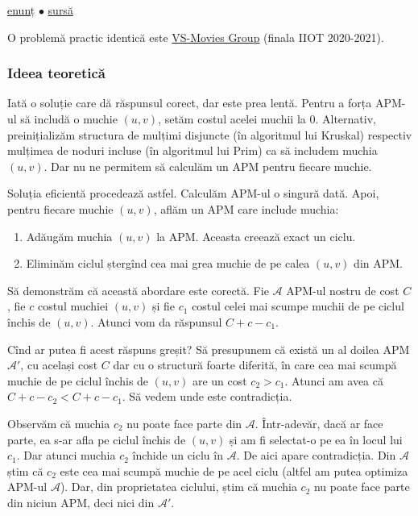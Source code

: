 \documentclass[../main.tex]{subfiles}
\begin{document}
\href{https://codeforces.com/contest/609/problem/E}{enunț}
$\bullet$
\hyperref[code:mst-for-each-edge]{sursă}

O problemă practic identică este \href{https://kilonova.ro/problems/1007}{VS-Movies Group} (finala IIOT 2020-2021).

\subsubsection*{Ideea teoretică}

Iată o soluție care dă răspunsul corect, dar este prea lentă. Pentru a forța APM-ul să includă o muchie $(u, v)$, setăm costul acelei muchii la 0. Alternativ, preinițializăm structura de mulțimi disjuncte (în algoritmul lui Kruskal) respectiv mulțimea de noduri incluse (în algoritmul lui Prim) ca să includem muchia $(u, v)$. Dar nu ne permitem să calculăm un APM pentru fiecare muchie.

Soluția eficientă procedează astfel. Calculăm APM-ul o singură dată. Apoi, pentru fiecare muchie $(u,v)$, aflăm un APM care include muchia:

\begin{enumerate}
  \item Adăugăm muchia $(u,v)$ la APM. Aceasta creează exact un ciclu.
  \item Eliminăm ciclul ștergînd cea mai grea muchie de pe calea $(u, v)$ din APM.
\end{enumerate}

Să demonstrăm că această abordare este corectă. Fie $\mathcal{A}$ APM-ul nostru de cost $C$, fie $c$ costul muchiei $(u,v)$ și fie $c_1$ costul celei mai scumpe muchii de pe ciclul închis de $(u,v)$. Atunci vom da răspunsul $C + c - c_1$.

Cînd ar putea fi acest răspuns greșit? Să presupunem că există un al doilea APM $\mathcal{A'}$, cu același cost $C$ dar cu o structură foarte diferită, în care cea mai scumpă muchie de pe ciclul închis de $(u,v)$ are un cost $c_2 > c_1$. Atunci am avea că $C + c - c_2 < C + c - c_1$. Să vedem unde este contradicția.

Observăm că muchia $c_2$ nu poate face parte din $\mathcal{A}$. Într-adevăr, dacă ar face parte, ea s-ar afla pe ciclul închis de $(u,v)$ și am fi selectat-o pe ea în locul lui $c_1$. Dar atunci muchia $c_2$ închide un ciclu în $\mathcal{A}$. De aici apare contradicția. Din $\mathcal{A}$ știm că $c_2$ este cea mai scumpă muchie de pe acel ciclu (altfel am putea optimiza APM-ul $\mathcal{A}$). Dar, din proprietatea ciclului, știm că muchia $c_2$ nu poate face parte din niciun APM, deci nici din $\mathcal{A'}$.
\end{document}
